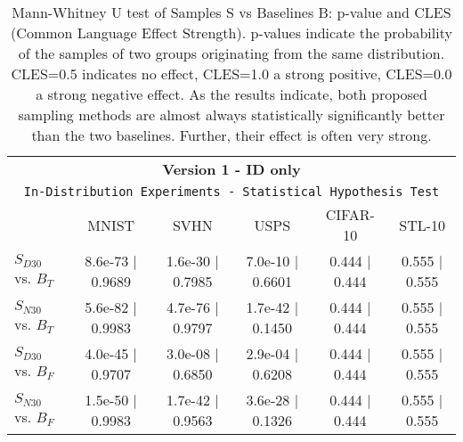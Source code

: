 \begin{table}[t]
\begin{minipage}[t]{0.98\textwidth}
\centering
{\small
\begin{tabular}{l|ccc|cc}
\toprule
\multicolumn{6}{c}{\textbf{Version 1 - ID only}}  \\
\multicolumn{6}{c}{\texttt{In-Distribution Experiments - Statistical Hypothesis Test}}  \\
 & MNIST & SVHN & USPS & CIFAR-10 & STL-10 \\
\midrule
$S_{D30}$ vs. $B_T$ & 8.6e-73 | 0.9689 & 1.6e-30 | 0.7985 & 7.0e-10 | 0.6601 & 0.444 | 0.444  & 0.555 | 0.555 \\ 
$S_{N30}$ vs. $B_T$ & 5.6e-82 | 0.9983 &  4.7e-76 | 0.9797 & 1.7e-42 | 0.1450 & 0.444 | 0.444  & 0.555 | 0.555 \\ 
\midrule
$S_{D30}$ vs. $B_F$ & 4.0e-45 | 0.9707 & 3.0e-08 | 0.6850 & 2.9e-04 | 0.6208 & 0.444 | 0.444  & 0.555 | 0.555 \\ 
$S_{N30}$ vs. $B_F$ & 1.5e-50 | 0.9983 & 1.7e-42 | 0.9563 & 3.6e-28 | 0.1326 & 0.444 | 0.444  & 0.555 | 0.555 \\ 
\end{tabular}
}
\caption{Mann-Whitney U test of Samples S vs Baselines B: p-value and CLES (Common Language Effect Strength). p-values indicate the probability of the samples of two groups originating from the same distribution. CLES=0.5 indicates no effect, CLES=1.0 a strong positive, CLES=0.0 a strong negative effect.
As the results indicate, both proposed sampling methods are almost always statistically significantly better than the two baselines. Further, their effect is often very strong. 
}
\label{tab:test_static_id}
\end{minipage}
\vspace{-.2in}
\end{table}
